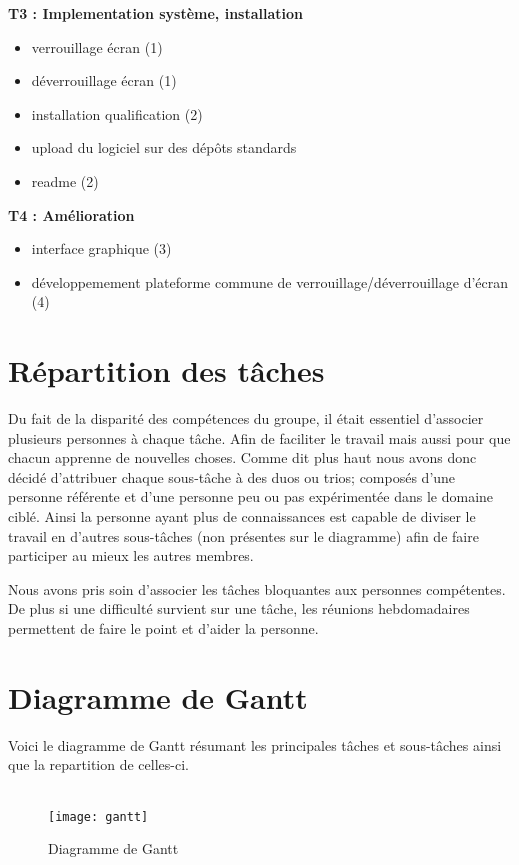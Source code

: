 \textbf{T3 : Implementation système, installation}
\begin{itemize}
  \item{verrouillage écran (1)}
  \item{déverrouillage écran (1)}
  \item{installation qualification (2)}
  \item{upload du logiciel sur des dépôts standards}
  \item{readme (2)}
\end{itemize}

\textbf{T4 : Amélioration}
\begin{itemize}
  \item{interface graphique (3)}
  \item{développemement plateforme commune de verrouillage/déverrouillage
        d’écran (4)}
\end{itemize}

\newpage

\section{Répartition des tâches}

Du fait de la disparité des compétences du groupe, il était essentiel
d'associer plusieurs personnes à chaque tâche. Afin de faciliter le travail
mais aussi pour que chacun apprenne de nouvelles choses. Comme dit plus haut
nous avons donc
décidé d'attribuer chaque sous-tâche à des duos ou trios; composés d'une
personne référente et d'une personne peu ou pas expérimentée dans le domaine
ciblé. Ainsi la personne ayant plus de connaissances est capable de diviser
le travail en d'autres sous-tâches (non présentes sur le diagramme) afin de faire
participer au mieux les autres membres.

Nous avons pris soin d'associer les tâches bloquantes aux personnes
compétentes. De plus si une difficulté survient sur une tâche,
les réunions hebdomadaires permettent de faire le point et d'aider la
personne.

\section{Diagramme de Gantt}
Voici le diagramme de Gantt résumant les principales tâches et sous-tâches
ainsi que la repartition de celles-ci.
\\
\\
\begin{figure}[h]
  \texttt{[image: gantt]}
  \caption{Diagramme de Gantt}
\end{figure}
